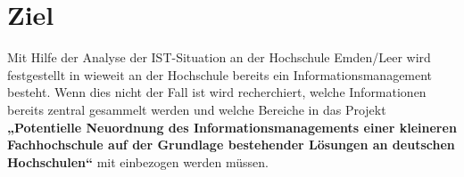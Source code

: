 \section{Ziel}
Mit Hilfe der Analyse der IST-Situation an der Hochschule Emden/Leer wird festgestellt in wieweit an der Hochschule bereits ein Informationsmanagement besteht. Wenn dies nicht der Fall ist wird recherchiert, welche Informationen bereits zentral gesammelt werden und welche Bereiche in das Projekt \textbf{„Potentielle Neuordnung des Informationsmanagements einer kleineren Fachhochschule auf der Grundlage bestehender Lösungen an deutschen Hochschulen“} mit einbezogen werden müssen.